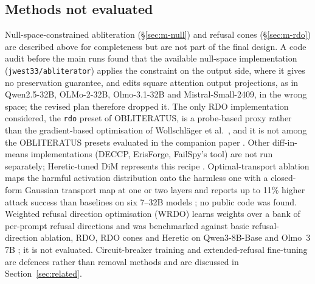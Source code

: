 \subsection{Methods not evaluated}
\label{sec:m-not}
Null-space-constrained abliteration (\S\ref{sec:m-null}) and refusal cones
(\S\ref{sec:m-rdo}) are described above for completeness but are not part of
the final design. A code audit before the main runs found that the available
null-space implementation (\texttt{jwest33/abliterator}) applies the
constraint on the output side, where it gives no preservation guarantee, and
edits square attention output projections, as in Qwen2.5-32B, OLMo-2-32B,
Olmo-3.1-32B and Mistral-Small-2409, in the wrong space; the revised
plan therefore dropped it. The only RDO implementation considered, the
\texttt{rdo} preset of OBLITERATUS, is a probe-based proxy rather than the
gradient-based optimisation of Wollschl\"ager et
al.~\cite{wollschlager2025geometry}, and it is not among the OBLITERATUS
presets evaluated in the companion paper \cite{young2026paper30}.
Other diff-in-means implementations (DECCP, ErisForge, FailSpy's tool) are not
run separately; Heretic-tuned DiM represents this recipe
\cite{young2025comparative}.
Optimal-transport ablation maps the harmful activation distribution onto the
harmless one with a closed-form Gaussian transport map at one or two layers
and reports up to 11\% higher attack success than baselines on six 7--32B
models \cite{nanfack2026ot}; no public code was found. Weighted refusal
direction optimisation (WRDO) learns weights over a bank of per-prompt refusal
directions and was benchmarked against basic refusal-direction ablation, RDO,
RDO cones and Heretic on Qwen3-8B-Base and Olmo~3 7B \cite{evseev2026wrdo};
it is not evaluated. Circuit-breaker training
\cite{zou2024circuit} and extended-refusal fine-tuning
\cite{abushairah2025defense} are defences rather than removal methods and are
discussed in Section~\ref{sec:related}.

